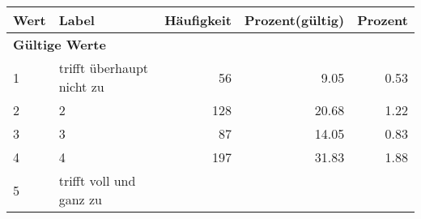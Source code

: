      \begin{longtable}{lXrrr}
     \toprule
     \textbf{Wert} & \textbf{Label} & \textbf{Häufigkeit} & \textbf{Prozent(gültig)} & \textbf{Prozent} \\
     \endhead
     \midrule
     \multicolumn{5}{l}{\textbf{Gültige Werte}}\\

     1 &
     \multicolumn{1}{X}{ trifft überhaupt nicht zu   } &


       \num{56} &
       \num[round-mode=places,round-precision=2]{9.05} &
         \num[round-mode=places,round-precision=2]{0.53} \\

     2 &
     \multicolumn{1}{X}{ 2   } &


       \num{128} &
       \num[round-mode=places,round-precision=2]{20.68} &
         \num[round-mode=places,round-precision=2]{1.22} \\

     3 &
     \multicolumn{1}{X}{ 3   } &


       \num{87} &
       \num[round-mode=places,round-precision=2]{14.05} &
         \num[round-mode=places,round-precision=2]{0.83} \\

     4 &
     \multicolumn{1}{X}{ 4   } &


       \num{197} &
       \num[round-mode=places,round-precision=2]{31.83} &
         \num[round-mode=places,round-precision=2]{1.88} \\

     5 &
     \multicolumn{1}{X}{ trifft voll und ganz zu   } &



\end{longtable}
